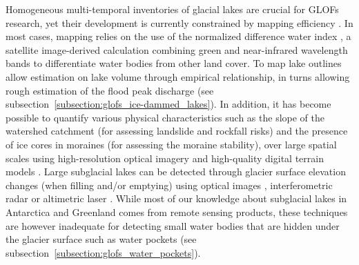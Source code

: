 Homogeneous multi-temporal inventories of glacial lakes are crucial for GLOFs research, yet their development is currently constrained by mapping efficiency \citep{Zhang&al2024}. In most cases, mapping relies on the use of the normalized difference water index \citep{McFeeters1996}, a satellite image-derived calculation combining green and near-infrared wavelength bands to differentiate water bodies from other land cover. To map lake outlines allow estimation on lake volume through empirical relationship, in turns allowing rough estimation of the flood peak discharge (see subsection~\ref{subsection:glofs_ice-dammed_lakes}). In addition, it has become possible to quantify various physical characteristics such as the slope of the watershed catchment (for assessing landslide and rockfall risks) and the presence of ice cores in moraines (for assessing the moraine stability), over large spatial scales using high-resolution optical imagery and high-quality digital terrain models \citep[e.g.][]{Dubey&al2020,Rounce&al2016,Allen&al2019}. Large subglacial lakes can be detected through glacier surface elevation changes (when filling and/or emptying) using optical images \citep[e.g.][]{livingstone&al2019}, interferometric radar \citep[e.g.][]{Capps&al2010} or altimetric laser \citep[e.g][]{Siegfried&al2021}. While most of our knowledge about subglacial lakes in Antarctica and Greenland comes from remote sensing products, these techniques are however inadequate for detecting small water bodies that are hidden under the glacier surface such as water pockets (see subsection~\ref{subsection:glofs_water_pockets}).


